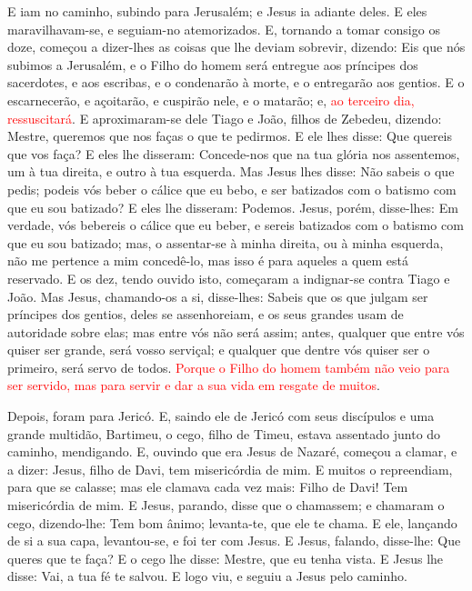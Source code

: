 E iam no caminho, subindo para Jerusalém; e Jesus ia adiante
deles. E eles maravilhavam-se, e seguiam-no atemorizados. E,
tornando a tomar consigo os doze, começou a dizer-lhes as coisas que
lhe deviam sobrevir, dizendo: Eis que nós subimos a
Jerusalém, e o Filho do homem será entregue aos príncipes dos
sacerdotes, e aos escribas, e o condenarão à morte, e o entregarão
aos gentios. E o escarnecerão, e açoitarão, e cuspirão nele,
e o matarão; e, \textcolor{red}{ao terceiro dia, ressuscitará}. E
aproximaram-se dele Tiago e João, filhos de Zebedeu, dizendo:
Mestre, queremos que nos faças o que te pedirmos. E ele lhes
disse: Que quereis que vos faça? E eles lhe disseram:
Concede-nos que na tua glória nos assentemos, um à tua direita, e
outro à tua esquerda. Mas Jesus lhes disse: Não sabeis o que
pedis; podeis vós beber o cálice que eu bebo, e ser batizados com o
batismo com que eu sou batizado? E eles lhe disseram:
Podemos. Jesus, porém, disse-lhes: Em verdade, vós bebereis o cálice
que eu beber, e sereis batizados com o batismo com que eu sou
batizado; mas, o assentar-se à minha direita, ou à minha
esquerda, não me pertence a mim concedê-lo, mas isso é para aqueles
a quem está reservado. E os dez, tendo ouvido isto, começaram
a indignar-se contra Tiago e João. Mas Jesus, chamando-os a
si, disse-lhes: Sabeis que os que julgam ser príncipes dos gentios,
deles se assenhoreiam, e os seus grandes usam de autoridade sobre
elas; mas entre vós não será assim; antes, qualquer que entre
vós quiser ser grande, será vosso serviçal; e qualquer que
dentre vós quiser ser o primeiro, será servo de todos.
\textcolor{red}{Porque o Filho do homem também não veio para ser
servido, mas para servir e dar a sua vida em resgate de muitos}.

Depois, foram para Jericó. E, saindo ele de Jericó com seus
discípulos e uma grande multidão, Bartimeu, o cego, filho de Timeu,
estava assentado junto do caminho, mendigando. E, ouvindo que
era Jesus de Nazaré, começou a clamar, e a dizer: Jesus, filho de
Davi, tem misericórdia de mim. E muitos o repreendiam, para
que se calasse; mas ele clamava cada vez mais: Filho de Davi! Tem
misericórdia de mim. E Jesus, parando, disse que o chamassem;
e chamaram o cego, dizendo-lhe: Tem bom ânimo; levanta-te, que ele
te chama. E ele, lançando de si a sua capa, levantou-se, e
foi ter com Jesus. E Jesus, falando, disse-lhe: Que queres
que te faça? E o cego lhe disse: Mestre, que eu tenha vista.
E Jesus lhe disse: Vai, a tua fé te salvou. E logo viu, e
seguiu a Jesus pelo caminho.

